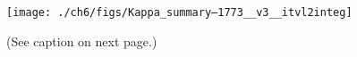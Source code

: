   \begin{figure}
    \centering
    \noindent\texttt{[image: ./ch6/figs/Kappa\_summary--1773\_\_v3\_\_itvl2integ]}
    \caption[Inverted V precipitation and best-fit Maxwellian and kappa
    distribution parameters (Orbit 1773)]{(See caption on next page.)}
    \label{ch6:Fig1}
  \end{figure}
